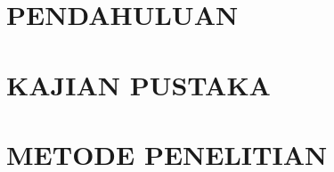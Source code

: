 \documentclass[12pt, a4paper, onecolumn, oneside, final]{report}
\begin{document}
\doublespacing
\renewcommand{\thechapter}{\Roman{chapter}}
\renewcommand{\thesection}{\arabic{chapter}.\arabic{section}}
\renewcommand{\thefigure}{\arabic{chapter}.\arabic{figure}}
\renewcommand{\thetable}{\arabic{chapter}.\arabic{table}}
\chapter{PENDAHULUAN} 
 

\chapter{KAJIAN PUSTAKA}


\chapter{METODE PENELITIAN}


\singlespacing
\renewcommand{\bibname}{Daftar Pustaka} %

\end{document}
